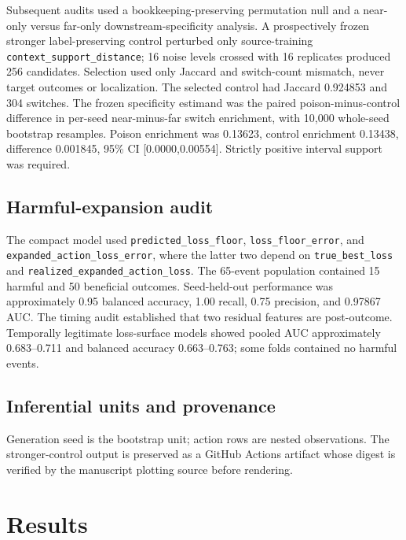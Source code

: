 \documentclass[preprint,12pt]{elsarticle}
\begin{document}
Subsequent audits used a bookkeeping-preserving permutation null and a near-only versus far-only downstream-specificity analysis. A prospectively frozen stronger label-preserving control perturbed only source-training \texttt{context\_support\_distance}; 16 noise levels crossed with 16 replicates produced 256 candidates. Selection used only Jaccard and switch-count mismatch, never target outcomes or localization. The selected control had Jaccard 0.924853 and 304 switches. The frozen specificity estimand was the paired poison-minus-control difference in per-seed near-minus-far switch enrichment, with 10,000 whole-seed bootstrap resamples. Poison enrichment was 0.13623, control enrichment 0.13438, difference 0.001845, 95\% CI [0.0000,0.00554]. Strictly positive interval support was required.
\subsection{Harmful-expansion audit} The compact model used \texttt{predicted\_loss\_floor}, \texttt{loss\_floor\_error}, and \texttt{expanded\_action\_loss\_error}, where the latter two depend on \texttt{true\_best\_loss} and \texttt{realized\_expanded\_action\_loss}. The 65-event population contained 15 harmful and 50 beneficial outcomes. Seed-held-out performance was approximately 0.95 balanced accuracy, 1.00 recall, 0.75 precision, and 0.97867 AUC. The timing audit established that two residual features are post-outcome. Temporally legitimate loss-surface models showed pooled AUC approximately 0.683--0.711 and balanced accuracy 0.663--0.763; some folds contained no harmful events.
\subsection{Inferential units and provenance} Generation seed is the bootstrap unit; action rows are nested observations. The stronger-control output is preserved as a GitHub Actions artifact whose digest is verified by the manuscript plotting source before rendering.
\section{Results}
\end{document}
